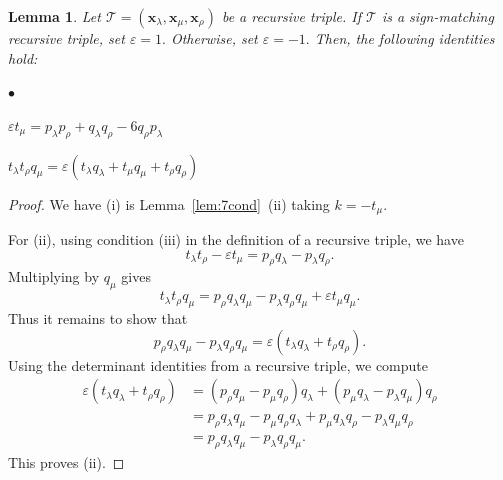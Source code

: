 \documentclass[11pt, reqno]{amsart}
\newtheorem{lemma}[thm]{Lemma}
\theoremstyle{remark}
\numberwithin{equation}{subsection}
\numberwithin{figure}{section}
\theoremstyle{customremark}
\newcommand{\Tt}{\mathcal{T}}
\newenvironment{itemlist}
   { \begin{list} {$\bullet$}
         { \setlength{\topsep}{.5ex}  \setlength{\itemsep}{.5ex} \setlength{\leftmargin}{2.5ex} } }
   { \end{list} }
\newcommand{\la}{{\lambda}}
\newcommand{\eps}{\varepsilon}
\begin{document}
\begin{lemma} \label{lem:relations} Let $\Tt=(\bm{x}_\la,\bm{x}_\mu,\bm{x}_\rho)$ be a recursive triple. If $\Tt$ is a sign-matching recursive triple, set $\eps=1.$ Otherwise, set $\eps=-1.$ Then, the following identities hold: 
    \begin{itemlist}
      \item[{(i)}] $ \eps t_\mu=p_\la p_\rho+q_\la q_\rho-6 q_\rho p_\la$
            \item[{(ii)}] $ t_\la t_\rho q_\mu=\eps(t_\la q_\la+t_\mu q_\mu +t_\rho q_\rho)$

    \end{itemlist}
\end{lemma}
\begin{proof}
    We have (i) is Lemma~\ref{lem:7cond}~(ii) taking $k=-t_\mu.$
  

    For (ii), using condition (iii) in the definition of a recursive triple, we have
\[
t_\lambda t_\rho-\eps t_\mu=p_\rho q_\lambda-p_\lambda q_\rho.
\]
Multiplying by $q_\mu$ gives
\[
t_\lambda t_\rho q_\mu
=
p_\rho q_\lambda q_\mu-p_\lambda q_\rho q_\mu+\eps t_\mu q_\mu.
\]
Thus it remains to show that
\[
p_\rho q_\lambda q_\mu-p_\lambda q_\rho q_\mu
=
\eps(t_\lambda q_\lambda+t_\rho q_\rho).
\]
Using the determinant identities from a recursive triple, we compute
\begin{align*}
\eps(t_\lambda q_\lambda+t_\rho q_\rho)
&=(p_\rho q_\mu-p_\mu q_\rho)q_\lambda
+(p_\mu q_\lambda-p_\lambda q_\mu)q_\rho\\
&=p_\rho q_\lambda q_\mu-p_\mu q_\rho q_\lambda
+p_\mu q_\lambda q_\rho-p_\lambda q_\mu q_\rho\\
&=p_\rho q_\lambda q_\mu-p_\lambda q_\rho q_\mu.
\end{align*}
This proves (ii).
 
\end{proof}
\end{document}
